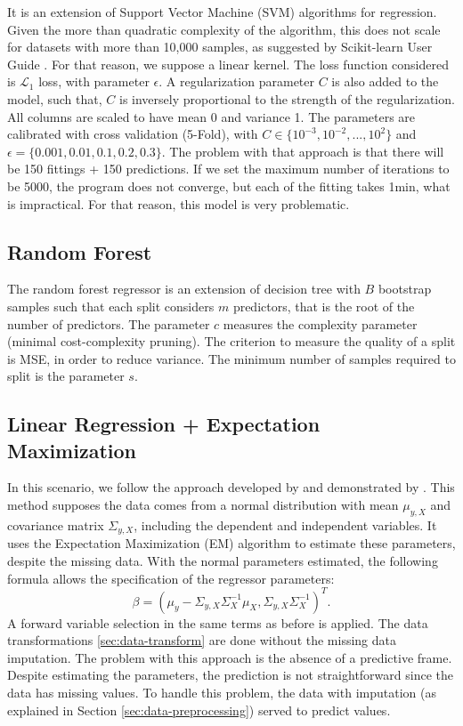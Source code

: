 It is an extension of Support Vector Machine (SVM) algorithms for
regression. Given the more than quadratic complexity of the algorithm, this
does not scale for datasets with more than 10,000 samples, as suggested by Scikit-learn User Guide \cite{svr-function,
scikit-learn}. For that reason, we
suppose a linear kernel. The loss function considered is $\mathcal{L}_1$ loss,
with parameter $\epsilon$. A regularization parameter $C$ is also added to the
model, such that, $C$ is inversely proportional to the strength of the
regularization. All columns are scaled to have mean 0 and variance 1. 
The parameters are calibrated with cross validation (5-Fold), with 
$C \in \{10^{-3}, 10^{-2}, ..., 10^2\}$ and $\epsilon =
\{0.001, 0.01, 0.1, 0.2, 0.3\}$. The problem with that approach is that there
will be 150 fittings + 150 predictions. If we set the maximum number of
iterations to be 5000, the program does not converge, but each of the fitting
takes 1min, what is impractical. For that reason, this model is very
problematic. 

\subsection{Random Forest}

The random forest regressor is an extension of decision tree with $B$
bootstrap samples such that each split considers $m$ predictors, that is the root of the number of predictors. The parameter
$c$ measures the complexity parameter (minimal cost-complexity pruning).
The criterion to measure the quality of a split is MSE, in order to reduce
variance. The minimum number of samples required to split is the parameter
$s$. 


\subsection{Linear Regression + Expectation Maximization}

In this scenario, we follow the approach developed by \cite{rubin1977} and
demonstrated by \cite{missing-values-estimation}. This method supposes the
data comes from a normal distribution with mean $\mu_{y,X}$ and covariance matrix
$\Sigma_{y,X}$, including the dependent and independent variables. It uses the Expectation Maximization (EM) algorithm to estimate
these parameters, despite the missing data. With the normal parameters estimated, the following formula
allows the specification of the regressor parameters:
$$
\beta = (\mu_y - \Sigma_{y,X}\Sigma_X^{-1}\mu_X, \Sigma_{y,X}\Sigma_X^{-1})^T.
$$
A forward variable selection in the same terms as before is applied. The data
transformations \ref{sec:data-transform} are done without the missing data imputation. The problem with this approach is the absence of a predictive frame. Despite
estimating the parameters, the prediction is not straightforward since the
data has missing values. To handle this problem, the data with imputation (as
explained in Section \ref{sec:data-preprocessing}) served to predict values.

